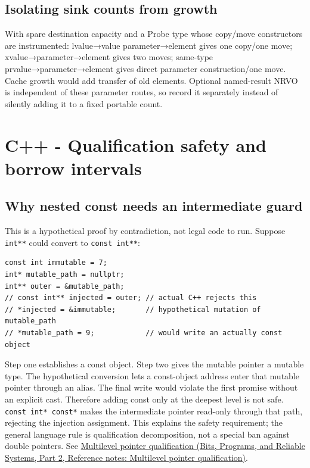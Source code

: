 \subsection{Isolating sink counts from growth}\label{03-visual-computing-i-ch018-isolating-sink-counts-from-growth}

\hypertarget{03-visual-computing-i-ch018-isolating-sink-counts-from-growth}{}

With spare destination capacity and a Probe type whose copy/move constructors are instrumented: lvalue→value parameter→element gives one copy/one move; xvalue→parameter→element gives two moves; same-type prvalue→parameter→element gives direct parameter construction/one move. Cache growth would add transfer of old elements. Optional named-result NRVO is independent of these parameter routes, so record it separately instead of silently adding it to a fixed portable count.

\section{C++ - Qualification safety and borrow intervals}\label{03-visual-computing-i-ch018-c---qualification-safety-and-borrow-intervals}

\hypertarget{03-visual-computing-i-ch018-c---qualification-safety-and-borrow-intervals}{}

\subsection{Why nested const needs an intermediate guard}\label{03-visual-computing-i-ch018-why-nested-const-needs-an-intermediate-guard}

\hypertarget{03-visual-computing-i-ch018-why-nested-const-needs-an-intermediate-guard}{}

This is a hypothetical proof by contradiction, not legal code to run. Suppose \texttt{int**} could convert to \texttt{const\ int**}:

\begin{verbatim}
const int immutable = 7;
int* mutable_path = nullptr;
int** outer = &mutable_path;
// const int** injected = outer; // actual C++ rejects this
// *injected = &immutable;       // hypothetical mutation of mutable_path
// *mutable_path = 9;            // would write an actually const object
\end{verbatim}

Step one establishes a const object. Step two gives the mutable pointer a mutable type. The hypothetical conversion lets a const-object address enter that mutable pointer through an alias. The final write would violate the first promise without an explicit cast. Therefore adding const only at the deepest level is not safe. \texttt{const\ int*\ const*} makes the intermediate pointer read-only through that path, rejecting the injection assignment. This explains the safety requirement; the general language rule is qualification decomposition, not a special ban against double pointers. See \href{../01-Bits-Programs-and-Reliable-Systems-P02/main.pdf\#nameddest=appendix-5e1a7561cd98}{Multilevel pointer qualification (Bits, Programs, and Reliable Systems, Part 2, Reference notes: Multilevel pointer qualification)}.

